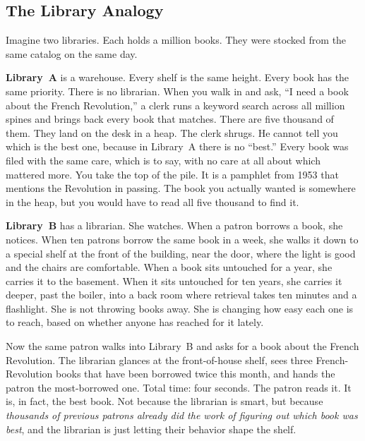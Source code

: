 \documentclass[11pt]{article}
\begin{document}
\subsection{The Library Analogy}
\label{app:feynman-library}

Imagine two libraries.  Each holds a million books.  They were
stocked from the same catalog on the same day.

\textbf{Library~A} is a warehouse.  Every shelf is the same height.
Every book has the same priority.  There is no librarian.  When
you walk in and ask, ``I need a book about the French Revolution,''
a clerk runs a keyword search across all million spines and brings
back every book that matches.  There are five thousand of them.
They land on the desk in a heap.  The clerk shrugs.  He cannot
tell you which is the best one, because in Library~A there is no
``best.''  Every book was filed with the same care, which is to
say, with no care at all about which mattered more.  You take the
top of the pile.  It is a pamphlet from 1953 that mentions the
Revolution in passing.  The book you actually wanted is somewhere
in the heap, but you would have to read all five thousand to find
it.

\textbf{Library~B} has a librarian.  She watches.  When a patron
borrows a book, she notices.  When ten patrons borrow the same
book in a week, she walks it down to a special shelf at the front
of the building, near the door, where the light is good and the
chairs are comfortable.  When a book sits untouched for a year,
she carries it to the basement.  When it sits untouched for ten
years, she carries it deeper, past the boiler, into a back room
where retrieval takes ten minutes and a flashlight.  She is not
throwing books away.  She is changing how easy each one is to
reach, based on whether anyone has reached for it lately.

Now the same patron walks into Library~B and asks for a book about
the French Revolution.  The librarian glances at the front-of-house
shelf, sees three French-Revolution books that have been borrowed
twice this month, and hands the patron the most-borrowed one.
Total time: four seconds.  The patron reads it.  It is, in fact,
the best book.  Not because the librarian is smart, but because
\emph{thousands of previous patrons already did the work of figuring
out which book was best}, and the librarian is just letting their
behavior shape the shelf.
\end{document}
